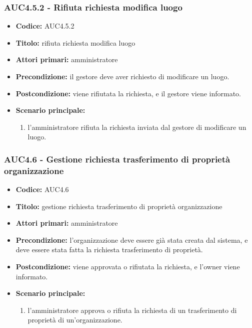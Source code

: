 \documentclass[casi-duso]{subfiles}
\begin{document}
\subsubsection{AUC4.5.2 - Rifiuta richiesta modifica luogo}%
\label{subsub:AUC4.5.2}
\begin{itemize}
  \item \textbf{Codice:} AUC4.5.2
  \item \textbf{Titolo:} rifiuta richiesta modifica luogo
  \item \textbf{Attori primari:} amministratore
  \item \textbf{Precondizione:} il gestore deve aver richiesto di modificare un luogo.
  \item \textbf{Postcondizione:} viene rifiutata la richiesta, e il gestore viene informato.
  \item \textbf{Scenario principale:}
  \begin{enumerate}
    \item l'amministratore rifiuta la richiesta inviata dal gestore di modificare un luogo.
  \end{enumerate}
\end{itemize}

\subsubsection{AUC4.6 - Gestione richiesta trasferimento di proprietà organizzazione}%
\label{subsub:AUC4.6}
\begin{itemize}
  \item \textbf{Codice:} AUC4.6
  \item \textbf{Titolo:} gestione richiesta trasferimento di proprietà organizzazione
  \item \textbf{Attori primari:} amministratore
  \item \textbf{Precondizione:} l'organizzazione deve essere già stata creata dal sistema, e deve essere stata fatta la richiesta trasferimento di proprietà.
  \item \textbf{Postcondizione:} viene approvata o rifiutata la richiesta, e l'owner viene informato.
  \item \textbf{Scenario principale:}
  \begin{enumerate}
    \item l'amministratore approva o rifiuta la richiesta di un trasferimento di proprietà di un'organizzazione.
  \end{enumerate}
\end{itemize}
\end{document}
